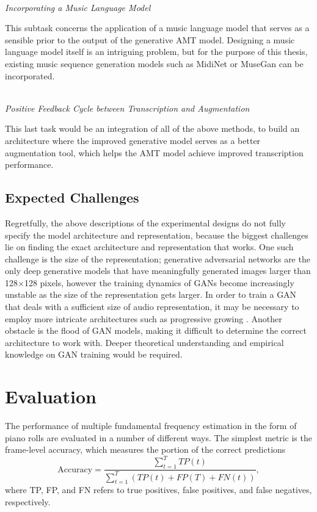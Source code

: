 \mbox{}\\\noindent\emph{Incorporating a Music Language Model}\mbox{}

This subtask concerns the application of a music language model that serves as a sensible prior to the output of the generative AMT model.
Designing a music language model itself is an intriguing problem, but for the purpose of this thesis, existing music sequence generation models such as MidiNet \cite{yang2017midinet} or MuseGan \cite{dong2017musegan} can be incorporated.

\mbox{}\\\noindent\emph{Positive Feedback Cycle between Transcription and Augmentation}\mbox{}

This last task would be an integration of all of the above methods, to build an architecture where the improved generative model serves as a better augmentation tool, which helps the AMT model achieve improved transcription performance.


\subsection{Expected Challenges}

Regretfully, the above descriptions of the experimental designs do not fully specify the model architecture and representation, because the biggest challenges lie on finding the exact architecture and representation that works.
One such challenge is the size of the representation; generative adversarial networks are the only deep generative models that have meaningfully generated images larger than 128$\times$128 pixels, however the training dynamics of GANs become increasingly unstable as the size of the representation gets larger.
In order to train a GAN that deals with a sufficient size of audio representation, it may be necessary to employ more intricate architectures such as progressive growing \cite{karras2017pggan}.
Another obstacle is the flood of GAN models, making it difficult to determine the correct architecture to work with.
Deeper theoretical understanding and empirical knowledge on GAN training would be required.

\section{Evaluation}

The performance of multiple fundamental frequency estimation in the form of piano rolls are evaluated in a number of different ways.
The simplest metric is the frame-level accuracy, which measures the portion of the correct predictions 
\begin{equation}
\mathrm{Accuracy} = \frac{\sum_{t=1}^T TP(t)}{\sum_{t=1}^T \left ( TP(t) + FP(T) + FN(t) \right ) },
\end{equation}
where TP, FP, and FN refers to true positives, false positives, and false negatives, respectively.

